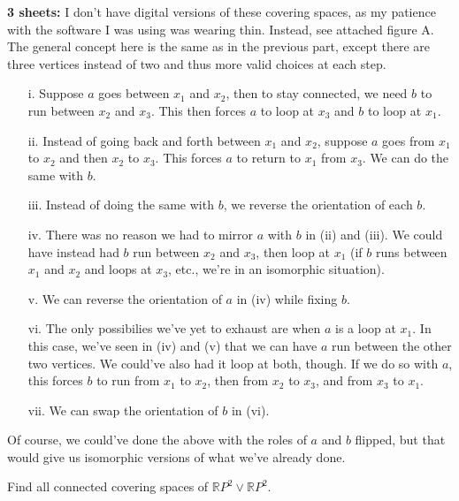 \documentclass[twoside,10pt]{article}
\begin{document}
\textbf{3 sheets:} I don't have digital versions of these covering spaces, as my patience with the software I was using was wearing thin. Instead, see attached figure A. The general concept here is the same as in the previous part, except there are three vertices instead of two and thus more valid choices at each step.

\begin{enumerate}
	\item[i.] Suppose $a$ goes between $x_1$ and $x_2$, then to stay connected, we need $b$ to run between $x_2$ and $x_3$. This then forces $a$ to loop at $x_3$ and $b$ to loop at $x_1$.

	\item[ii.] Instead of going back and forth between $x_1$ and $x_2$, suppose $a$ goes from $x_1$ to $x_2$ and then $x_2$ to $x_3$. This forces $a$ to return to $x_1$ from $x_3$. We can do the same with $b$.

	\item[iii.] Instead of doing the same with $b$, we reverse the orientation of each $b$.

	\item[iv.] There was no reason we had to mirror $a$ with $b$ in (ii) and (iii). We could have instead had $b$ run between $x_2$ and $x_3$, then loop at $x_1$ (if $b$ runs between $x_1$ and $x_2$ and loops at $x_3$, etc., we're in an isomorphic situation).

	\item[v.] We can reverse the orientation of $a$ in (iv) while fixing $b$.

	\item[vi.] The only possibilies we've yet to exhaust are when $a$ is a loop at $x_1$. In this case, we've seen in (iv) and (v) that we can have $a$ run between the other two vertices. We could've also had it loop at both, though. If we do so with $a$, this forces $b$ to run from $x_1$ to $x_2$, then from $x_2$ to $x_3$, and from $x_3$ to $x_1$.

	\item[vii.] We can swap the orientation of $b$ in (vi).
\end{enumerate}

Of course, we could've done the above with the roles of $a$ and $b$ flipped, but that would give us isomorphic versions of what we've already done.

\newpage

\begin{exer}[1.3: 14]
Find all connected covering spaces of $\mathbb{R}P^2 \vee \mathbb{R}P^2$.
\end{exer}
\end{document}
